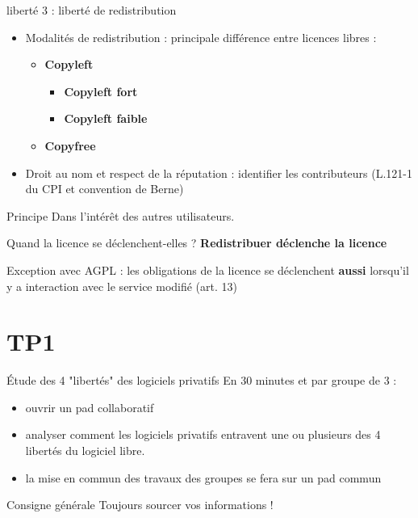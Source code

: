 \documentclass{beamer}
\begin{document}
\begin{frame}{liberté 3 : liberté de redistribution}
  \begin{itemize}
  \item Modalités de redistribution : principale différence entre licences libres :
    \begin{itemize}
    \item \textbf{Copyleft}
    \begin{itemize}
    	\item \textbf{Copyleft fort}
  	    \item \textbf{Copyleft faible}
  	\end{itemize}
    \item \textbf{Copyfree}
    \end{itemize}

  \item Droit au nom et respect de la réputation : identifier les contributeurs (L.121-1 du CPI et convention de Berne)
   \end{itemize}
\begin{alertblock}{Principe}
    Dans l'intérêt des autres utilisateurs.
  \end{alertblock}

\begin{alertblock}{Quand la licence se déclenchent-elles ?}
\textbf{Redistribuer déclenche la licence}
 \end{alertblock}
 
Exception avec AGPL : les obligations de la licence se déclenchent \textbf{aussi} lorsqu'il y a interaction avec le service modifié (art. 13)
\end{frame}

\section{TP1}

\begin{frame}{Étude des 4 "libertés" des logiciels privatifs}
  En 30 minutes et par groupe de 3 :
  \begin{itemize}
  \item ouvrir un pad collaboratif
  \item analyser comment les logiciels privatifs entravent une ou plusieurs des 4 libertés du logiciel libre.
  \item la mise en commun des travaux des groupes se fera sur un pad commun
  \end{itemize}

  \begin{alertblock}{Consigne générale}
    Toujours sourcer vos informations !
  \end{alertblock}
\end{frame}
\end{document}
